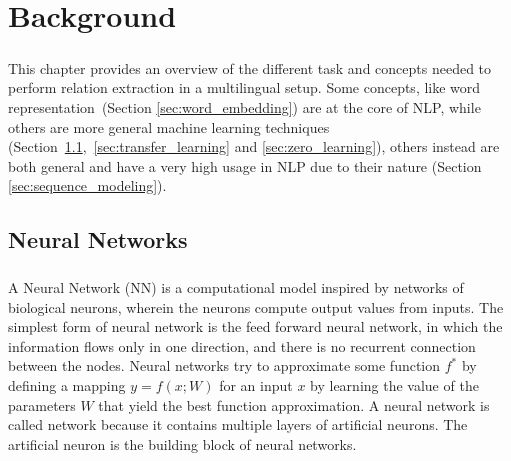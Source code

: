 \chapter{Background}
\label{chpt:2}
\paragraph{}
This chapter provides an overview of the different task and concepts needed to perform relation extraction in a multilingual setup. Some concepts, like word representation~(Section \ref{sec:word_embedding}) are at the core of NLP, while others are more general machine learning techniques (Section~\ref{sec:nn},~\ref{sec:transfer_learning} and \ref{sec:zero_learning}), others instead are both general and have a very high usage in NLP due to their nature (Section \ref{sec:sequence_modeling}). 




\section{Neural Networks}
\label{sec:nn}

\paragraph{}
A Neural Network (NN) is a computational model inspired by networks of biological neurons, wherein the neurons compute output values from inputs. The simplest form of neural network is the feed forward neural network, in which the information flows only in one direction, and there is no recurrent connection between the nodes. Neural networks try to approximate some function $f^{*}$ by defining a mapping $y = f(x; W)$ for an input $x$ by  learning the value of the parameters $W$ that yield the best function approximation. A neural network is called network because it contains multiple layers of artificial neurons. The artificial neuron is the building block of neural networks.

